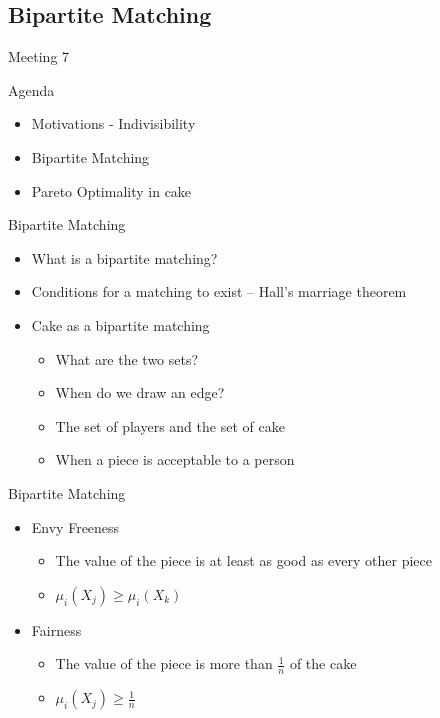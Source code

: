\documentclass[aspectratio=169,xcolor=dvipsnames]{beamer}
\begin{document}
\subsection{Bipartite Matching}
\begin{frame}{Meeting 7}
	\begin{block}{Agenda}
		\begin{itemize}
			\item Motivations - Indivisibility
			\item Bipartite Matching
			\item Pareto Optimality in cake
		\end{itemize}
	\end{block}
\end{frame}
\begin{frame}{Bipartite Matching}
	\begin{itemize}
		\item What is a bipartite matching? \pause
		\item Conditions for a matching to exist -- Hall's marriage theorem \pause
		\item Cake as a bipartite matching
		\begin{itemize}
			\item What are the two sets? 
			\item When do we draw an edge? \pause
			\item The set of players and the set of cake
			\item When a piece is acceptable to a person
		\end{itemize}
	\end{itemize}
\end{frame}
\begin{frame}{Bipartite Matching}
	\begin{itemize}
		\item Envy Freeness
		\begin{itemize}
			\item The value of the piece is at least as good as every other piece
			\item $\mu_i(X_j) \geq \mu_i(X_k)$
		\end{itemize}\pause
		\item Fairness 
		\begin{itemize}
			\item The value of the piece is more than $ \frac{1}{n} $ of the cake
			\item $ \mu_i(X_j) \geq \frac{1}{n} $
		\end{itemize}
	\end{itemize}
\end{frame}
\end{document}
